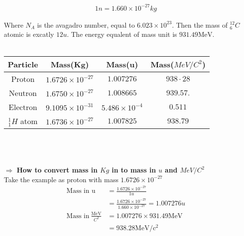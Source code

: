 \begin{enumerate}
\begin{center}
{{			\begin{align*}
			1 n=1.660 \times 10^{-27} kg
			\end{align*}} }
\end{center}
Where $N_A$ is the avagadro number, equal to $6.023 \times 10^{23}$. Then the mass of $^{12}_6C$ atomic is excatly $12 u$. The energy equalent of mass unit is $931.49 \mathrm{MeV} .$\\\\
\renewcommand*{\arraystretch}{1.5}
\begin{tabular}{c|c|c|c|}
	\hline
	Particle & Mass(Kg) & Mass(u) & Mass($Me V/C^2$)\\
	\hline
	Proton & $1.6726 \times 10^{-27}$ & $1.007276$ & $938 \cdot 28$\\
	\hline
	Neutron & $1.6750 \times10^{-27}$ & $1.008665$ & $939.57 .$\\
	\hline
	Electron & $9.1095 \times 10^{-31}$ & $5.486 \times 10^{-4}$ & $0.511$\\
	\hline
	$^1_1 H$ atom & $1.6736 \times 10^{-27}$ & $1.007825$ & $938.79$\\
	\hline
\end{tabular}\\\\\\
$\Rightarrow$ \textbf{How to convert mass in $Kg$ in to mass in $u$ and $MeV/C^2$}\\
Take the example as proton with mass $1.6726 \times 10^{-27}$ 
\begin{align*}
\text{Mass in u}&=\frac{1.6726 \times 10^{-27}}{1u}\\
&=\frac{1.6726 \times 10^{-27}}{1.660 \times 10^{-27}}=1.007276u\\
\text{Mass in}\  \frac{\mathrm{MeV}}{C^2} &=1.007276 \times 931.49 \mathrm{MeV}\\
&=938.28 \mathrm{MeV} / \mathrm{c}^{2} 
\end{align*}
\end{enumerate}
